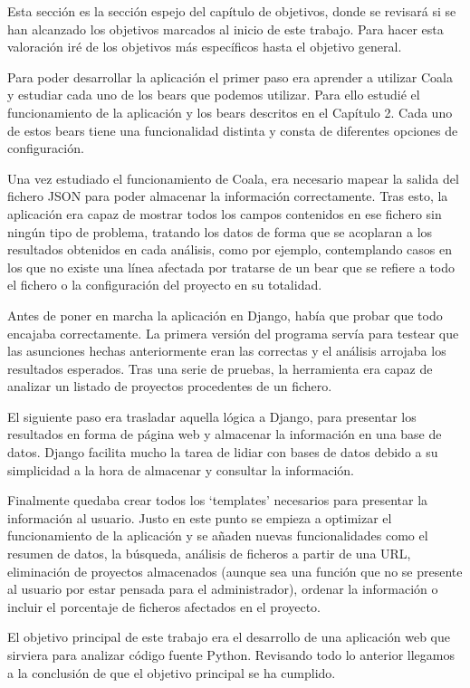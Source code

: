 \documentclass[a4paper, 12pt]{book}
\begin{document}
Esta sección es la sección espejo del capítulo de objetivos, donde se revisará si se han alcanzado los objetivos marcados al inicio de este trabajo. Para hacer esta valoración iré de los objetivos más específicos hasta el objetivo general.

Para poder desarrollar la aplicación el primer paso era aprender a utilizar Coala y estudiar cada uno de los bears que podemos utilizar. Para ello estudié el funcionamiento de la aplicación y los bears descritos en el Capítulo 2. Cada uno de estos bears tiene una funcionalidad distinta y consta de diferentes opciones de configuración.

Una vez estudiado el funcionamiento de Coala, era necesario mapear la salida del fichero JSON para poder almacenar la información correctamente. Tras esto, la aplicación era capaz de mostrar todos los campos contenidos en ese fichero sin ningún tipo de problema, tratando los datos de forma que se acoplaran a los resultados obtenidos en cada análisis, como por ejemplo, contemplando casos en los que no existe una línea afectada por tratarse de un bear que se refiere a todo el fichero o la configuración del proyecto en su totalidad.

Antes de poner en marcha la aplicación en Django, había que probar que todo encajaba correctamente. La primera versión del programa servía para testear que las asunciones hechas anteriormente eran las correctas y el análisis arrojaba los resultados esperados. Tras una serie de pruebas, la herramienta era capaz de analizar un listado de proyectos procedentes de un fichero.

El siguiente paso era trasladar aquella lógica a Django, para presentar los resultados en forma de página web y almacenar la información en una base de datos. Django facilita mucho la tarea de lidiar con bases de datos debido a su simplicidad a la hora de almacenar y consultar la información.

Finalmente quedaba crear todos los `templates' necesarios para presentar la información al usuario. Justo en este punto se empieza a optimizar el funcionamiento de la aplicación y se añaden nuevas funcionalidades como el resumen de datos, la búsqueda, análisis de ficheros a partir de una URL, eliminación de proyectos almacenados (aunque sea una función que no se presente al usuario por estar pensada para el administrador), ordenar la información o incluir el porcentaje de ficheros afectados en el proyecto.

El objetivo principal de este trabajo era el desarrollo de una aplicación web que sirviera para analizar código fuente Python. Revisando todo lo anterior llegamos a la conclusión de que el objetivo principal se ha cumplido.
\end{document}
